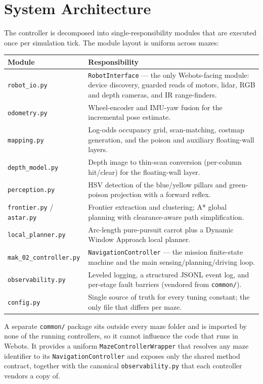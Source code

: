 \documentclass[11pt,a4paper]{article}
\newcommand{\code}[1]{\colorbox{codegray}{\texttt{\small #1}}}
\begin{document}
\section{System Architecture}

The controller is decomposed into single-responsibility modules that are
executed once per simulation tick. The module layout is uniform across mazes:

\begin{center}
\small
\begin{tabular}{@{}p{3.2cm}p{12.0cm}@{}}
\toprule
\textbf{Module} & \textbf{Responsibility} \\
\midrule
\code{robot\_io.py} & \code{RobotInterface} --- the only Webots-facing module: device discovery, guarded reads of motors, lidar, RGB and depth cameras, and IR range-finders. \\
\code{odometry.py} & Wheel-encoder and IMU-yaw fusion for the incremental pose estimate. \\
\code{mapping.py} & Log-odds occupancy grid, scan-matching, costmap generation, and the poison and auxiliary floating-wall layers. \\
\code{depth\_model.py} & Depth image to thin-scan conversion (per-column hit/clear) for the floating-wall layer. \\
\code{perception.py} & HSV detection of the blue/yellow pillars and green-poison projection with a forward reflex. \\
\code{frontier.py} / \code{astar.py} & Frontier extraction and clustering; A* global planning with clearance-aware path simplification. \\
\code{local\_planner.py} & Arc-length pure-pursuit carrot plus a Dynamic Window Approach local planner. \\
\code{mak\_02\_controller.py} & \code{NavigationController} --- the mission finite-state machine and the main sensing/planning/driving loop. \\
\code{observability.py} & Leveled logging, a structured JSONL event log, and per-stage fault barriers (vendored from \code{common/}). \\
\code{config.py} & Single source of truth for every tuning constant; the only file that differs per maze. \\
\bottomrule
\end{tabular}
\end{center}

A separate \code{common/} package sits outside every maze folder and is imported
by none of the running controllers, so it cannot influence the code that runs
in Webots. It provides a uniform \code{MazeControllerWrapper} that resolves any
maze identifier to its \code{NavigationController} and exposes only the shared
method contract, together with the canonical \code{observability.py} that each
controller vendors a copy of.
\end{document}
